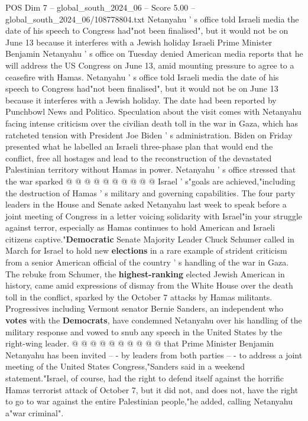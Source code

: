 \begin{textsample}{POS Dim 7 – global\_south\_2024\_06 – Score 5.00 – global\_south\_2024\_06/108778804.txt}  \label{ex:f7_pos_245}
Netanyahu ' s office told Israeli media the date of his speech to Congress had"not been finalised", but it would not be on June 13 because it interferes with a Jewish holiday Israeli Prime Minister Benjamin Netanyahu ' s office on Tuesday denied American media reports that he will address the US Congress on June 13, amid mounting pressure to agree to a ceasefire with Hamas.
Netanyahu ' s office told Israeli media the date of his speech to Congress had"not been finalised", but it would not be on June 13 because it interferes with a Jewish holiday.
The date had been reported by Punchbowl News and Politico.
Speculation about the visit comes with Netanyahu facing intense criticism over the civilian death toll in the war in Gaza, which has ratcheted tension with President Joe Biden ' s administration.
Biden on Friday presented what he labelled an Israeli three-phase plan that would end the conflict, free all hostages and lead to the reconstruction of the devastated Palestinian territory without Hamas in power.
Netanyahu ' s office stressed that the war sparked @ @ @ @ @ @ @ @ @ @ Israel ' s"goals are achieved,"including the destruction of Hamas ' s military and governing capabilities.
The four party leaders in the House and Senate asked Netanyahu last week to speak before a joint meeting of Congress in a letter voicing solidarity with Israel"in your struggle against terror, especially as Hamas continues to hold American and Israeli citizens captive."\textbf{Democratic} Senate Majority Leader Chuck Schumer called in March for Israel to hold new \textbf{elections} in a rare example of strident criticism from a senior American official of the country ' s handling of the war in Gaza.
The rebuke from Schumer, the \textbf{highest-ranking} elected Jewish American in history, came amid expressions of dismay from the White House over the death toll in the conflict, sparked by the October 7 attacks by Hamas militants.
Progressives including Vermont senator Bernie Sanders, an independent who \textbf{votes} with the \textbf{Democrats}, have condemned Netanyahu over his handling of the military response and vowed to snub any speech in the United States by the right-wing leader. @ @ @ @ @ @ @ @ @ @ that Prime Minister Benjamin Netanyahu has been invited -- - by leaders from both parties -- - to address a joint meeting of the United States Congress,"Sanders said in a weekend statement."Israel, of course, had the right to defend itself against the horrific Hamas terrorist attack of October 7, but it did not, and does not, have the right to go to war against the entire Palestinian people,"he added, calling Netanyahu a"war criminal".

\end{textsample}
